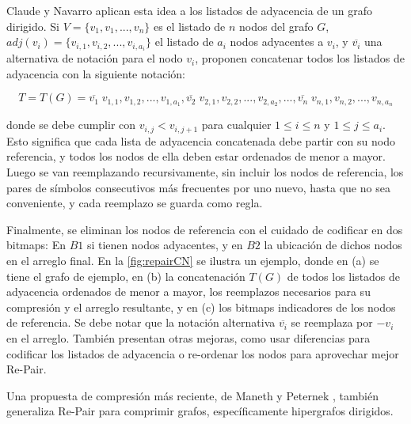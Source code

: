 

Claude y Navarro \cite{claude2010fast} aplican esta idea a los listados de adyacencia de un grafo dirigido. Si $V = \{v_{1}, v_{1}, ..., v_{n}\}$ es el listado de $n$ nodos del grafo $G$, $adj(v_{i}) = \{v_{i,1}, v_{i,2},... , v_{i,a_{i}}\}$ el listado de $a_{i}$ nodos adyacentes a $v_{i}$, y $\overline{v_{i}}$ una alternativa de notación para el nodo $v_{i}$, proponen concatenar todos los listados de adyacencia con la siguiente notación:

\begin{equation} \label{eq:RepairGrafo}
	T = T(G) = \overline{v_{1}} \; v_{1,1}, v_{1,2}, ..., v_{1,a_{1}}, \overline{v_{2}} \; v_{2,1}, v_{2,2}, ..., v_{2,a_{2}}, ..., \overline{v_{n}} \; v_{n,1}, v_{n,2}, ..., v_{n,a_{n}}
\end{equation}

\noindent donde se debe cumplir con $v_{i,j} < v_{i, j+1}$ para cualquier $1 \leq i \leq n$ y $1 \leq j \leq a_{i}$. Esto significa que cada lista de adyacencia concatenada debe partir con su nodo referencia, y todos los nodos de ella deben estar ordenados de menor a mayor. Luego se van reemplazando recursivamente, sin incluir los nodos de referencia, los pares de símbolos consecutivos más frecuentes por uno nuevo, hasta que no sea conveniente, y cada reemplazo se guarda como regla. 

Finalmente, se eliminan los nodos de referencia con el cuidado de codificar en dos bitmaps: En $B1$ si tienen nodos adyacentes, y en $B2$ la ubicación de dichos nodos en el arreglo final. En la \autoref{fig:repairCN} se ilustra un ejemplo, donde en (a) se tiene el grafo de ejemplo, en (b) la concatenación $T(G)$ de todos los listados de adyacencia ordenados de menor a mayor, los reemplazos necesarios para su compresión y el arreglo resultante, y en (c) los bitmaps indicadores de los nodos de referencia. Se debe notar que la notación alternativa $\overline{v_{i}}$ se reemplaza por $-v_{i}$ en el arreglo. También presentan otras mejoras, como usar diferencias para codificar los listados de adyacencia o re-ordenar los nodos para aprovechar mejor Re-Pair.



Una propuesta de compresión más reciente, de Maneth y Peternek \cite{maneth2016compressing}, también generaliza Re-Pair para comprimir grafos, específicamente hipergrafos dirigidos.



